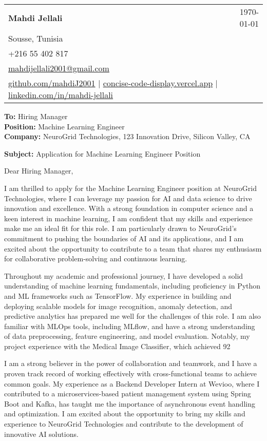 \documentclass[letterpaper,11pt]{article}
\makeatletter
\newcommand{\letterHeading}[5]{
    \begin{tabular*}{\textwidth}{l@{\extracolsep{\fill}}r}
    \textbf{\Large #1} & #5 \\  %
    #2 & \\
    #3 & \\
    #4 & \\
    \end{tabular*}
    \vspace{15pt}
}
\newcommand{\letterRecipient}[3]{
    \textbf{\large To:} #1 \\
    \textbf{\large Position:} #2 \\
    \textbf{\large Company:} #3 \\
    \vspace{12pt}
}
\newcommand{\letterSubject}[1]{
    \textbf{\large Subject:} #1 \\
    \vspace{15pt}
}
\makeatother
\begin{document}
    \letterHeading
    {Mahdi Jellali}
    {Sousse, Tunisia}
    {+216 55 402 817 \\ \href{mailto:mahdijellali2001@gmail.com}{mahdijellali2001@gmail.com}}
    {\href{https://github.com/mahdiJ2001}{github.com/mahdiJ2001} $|$ \href{https://concise-code-display.vercel.app/}{concise-code-display.vercel.app} $|$ \href{https://www.linkedin.com/in/mahdi-jellali/}{linkedin.com/in/mahdi-jellali}}
    {\today}

    \letterRecipient
    {Hiring Manager}
    {Machine Learning Engineer}
    {NeuroGrid Technologies, 123 Innovation Drive, Silicon Valley, CA}

    \letterSubject{Application for Machine Learning Engineer Position}

    Dear Hiring Manager,

    I am thrilled to apply for the Machine Learning Engineer position at NeuroGrid Technologies, where I can leverage my passion for AI and data science to drive innovation and excellence. With a strong foundation in computer science and a keen interest in machine learning, I am confident that my skills and experience make me an ideal fit for this role. I am particularly drawn to NeuroGrid's commitment to pushing the boundaries of AI and its applications, and I am excited about the opportunity to contribute to a team that shares my enthusiasm for collaborative problem-solving and continuous learning.

    Throughout my academic and professional journey, I have developed a solid understanding of machine learning fundamentals, including proficiency in Python and ML frameworks such as TensorFlow. My experience in building and deploying scalable models for image recognition, anomaly detection, and predictive analytics has prepared me well for the challenges of this role. I am also familiar with MLOps tools, including MLflow, and have a strong understanding of data preprocessing, feature engineering, and model evaluation. Notably, my project experience with the Medical Image Classifier, which achieved 92%

    I am a strong believer in the power of collaboration and teamwork, and I have a proven track record of working effectively with cross-functional teams to achieve common goals. My experience as a Backend Developer Intern at Wevioo, where I contributed to a microservices-based patient management system using Spring Boot and Kafka, has taught me the importance of asynchronous event handling and optimization. I am excited about the opportunity to bring my skills and experience to NeuroGrid Technologies and contribute to the development of innovative AI solutions.
\end{document}
